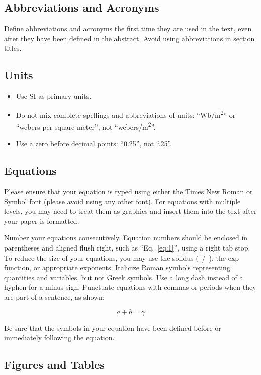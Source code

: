 \documentclass[a4paper,11pt]{article}
\begin{document}
\setcounter{subsection}{0} %
\subsection{Abbreviations and Acronyms}
Define abbreviations and acronyms the first time they are used in the text, even after they have been defined in the abstract. Avoid using abbreviations in section titles.

\subsection{Units}
\begin{itemize}
    \item Use SI as primary units.
    \item Do not mix complete spellings and abbreviations of units: ``Wb/m\textsuperscript{2}'' or “webers per square meter”, not ``webers/m\textsuperscript{2}''.
    \item Use a zero before decimal points: ``0.25'', not ``.25''.
\end{itemize}
\subsection{Equations}
\par Please ensure that your equation is typed using either the Times New Roman or Symbol font (please avoid using any other font). For equations with multiple levels, you may need to treat them as graphics and insert them into the text after your paper is formatted.
\par Number your equations consecutively. Equation numbers should be enclosed in parentheses and aligned flush right, such as ``Eq.~\eqref{eq:1}'', using a right tab stop. To reduce the size of your equations, you may use the solidus (~/~), the exp function, or appropriate exponents. Italicize Roman symbols representing quantities and variables, but not Greek symbols. Use a long dash instead of a hyphen for a minus sign. Punctuate equations with commas or periods when they are part of a sentence, as shown:

\begin{equation}
a + b = \gamma
\label{eq:1}
\end{equation}

\par Be sure that the symbols in your equation have been defined before or immediately following the equation.

\subsection{Figures and Tables}
\end{document}

